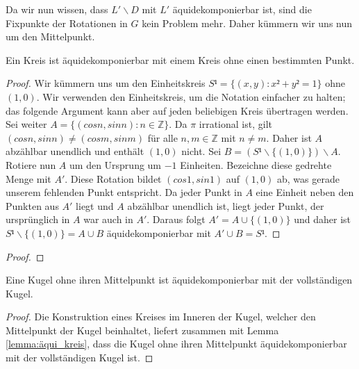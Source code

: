 Da wir nun wissen, dass $L'\backslash D$ mit $L'$ äquidekomponierbar ist, sind die Fixpunkte der Rotationen in $G$ kein Problem mehr.
Daher kümmern wir uns nun um den Mittelpunkt.

\begin{lemma} \label{lemma:aequi_kreis}
Ein Kreis ist äquidekomponierbar mit einem Kreis ohne einen bestimmten Punkt.
 \leanok
\end{lemma}
\begin{proof} 
Wir kümmern uns um den Einheitskreis $S¹=\{(x,y):x²+y²=1\}$ ohne ${(1,0)}$. Wir verwenden den Einheitskreis, um die Notation einfacher zu halten; 
das folgende Argument kann aber auf jeden beliebigen Kreis übertragen werden.
Sei weiter $A=\{(cos n,sin n):n\in\mathbb{Z}\}$. Da $\pi$ irrational ist, gilt $(cos n,sin n)\neq (cos m, sin m)$ für alle $n,m\in\mathbb{Z}$
mit $n\neq m$. Daher ist $A$ abzählbar unendlich und enthält $(1,0)$ nicht. Sei $B=(S¹\backslash\{(1,0)\})\backslash A$.
Rotiere nun $A$ um den Ursprung um $-1$ Einheiten. Bezeichne diese gedrehte Menge mit $A'$. Diese Rotation bildet $(cos 1,sin 1)$ auf $(1,0)$
ab, was gerade unserem fehlenden Punkt entspricht. Da jeder Punkt in $A$ eine Einheit neben den Punkten aus $A'$ liegt und $A$ abzählbar unendlich
ist, liegt jeder Punkt, der ursprünglich in $A$ war auch in $A'$. Daraus folgt $A'=A\cup \{(1,0)\}$ und daher ist
$S¹\backslash \{(1,0)\}=A\cup B$ äquidekomponierbar mit $A'\cup B=S¹$.
\end{proof}


\begin{lemma} 
\label{lemma:equi_subset}
\leanok
{}
\end{lemma}
\begin{proof}
\end{proof}

\begin{theorem} \label{theorem:aequi_kugel}
Eine Kugel ohne ihren Mittelpunkt ist äquidekomponierbar mit der vollständigen Kugel.
 \leanok
\end{theorem}
\begin{proof} 
Die Konstruktion eines Kreises im Inneren der Kugel, welcher den Mittelpunkt der Kugel beinhaltet, liefert zusammen mit Lemma \ref{lemma:äqui_kreis},
dass die Kugel ohne ihren Mittelpunkt äquidekomponierbar mit der vollständigen Kugel ist.
\end{proof}

